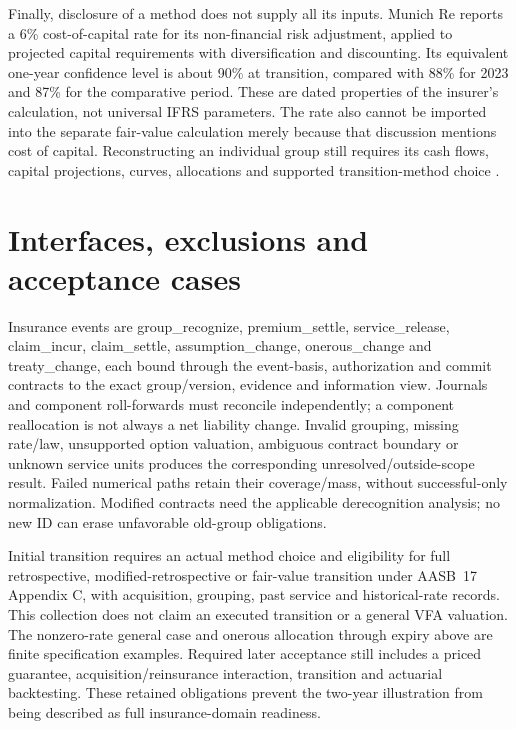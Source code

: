 Finally, disclosure of a method does not supply all its inputs. Munich Re
reports a 6\% cost-of-capital rate for its non-financial risk adjustment,
applied to projected capital requirements with diversification and discounting.
Its equivalent one-year confidence level is about 90\% at transition, compared
with 88\% for 2023 and 87\% for the comparative period. These are dated
properties of the insurer's calculation, not universal IFRS parameters.
The rate also cannot be imported into the separate fair-value calculation
merely because that discussion mentions cost of capital. Reconstructing an
individual group still requires its cash flows, capital projections, curves,
allocations and supported transition-method choice
\citep[pp.~165, 183 and 185]{munichre2023annual}.

\clearpage
\hypertarget{interfaces-exclusions-and-acceptance-cases}{%
\section{Interfaces, exclusions and acceptance cases}\label{method-insurance-methods-interfaces-exclusions-and-acceptance-cases}}

Insurance events are group\_recognize, premium\_settle, service\_release, claim\_incur, claim\_settle, assumption\_change, onerous\_change and treaty\_change, each bound through the event-basis, authorization and commit contracts to the exact group/version, evidence and information view. Journals and component roll-forwards must reconcile independently; a component reallocation is not always a net liability change. Invalid grouping, missing rate/law, unsupported option valuation, ambiguous contract boundary or unknown service units produces the corresponding unresolved/outside-scope result. Failed numerical paths retain their coverage/mass, without successful-only normalization. Modified contracts need the applicable derecognition analysis; no new ID can erase unfavorable old-group obligations.

Initial transition requires an actual method choice and eligibility for full retrospective, modified-retrospective or fair-value transition under AASB~17 Appendix C, with acquisition, grouping, past service and historical-rate records. This collection does not claim an executed transition or a general VFA valuation. The nonzero-rate general case and onerous allocation through expiry above are finite specification examples. Required later acceptance still includes a priced guarantee, acquisition/reinsurance interaction, transition and actuarial backtesting. These retained obligations prevent the two-year illustration from being described as full insurance-domain readiness.
